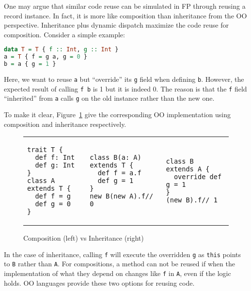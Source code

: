 One may argue that similar code reuse can be simulated in FP through reusing a record instance.
In fact, it is more like composition than inheritance from the OO perspective.
Inheritance plus dynamic dispatch maximize the code reuse for composition.
Consider a simple example:

\begin{lstlisting}[language=haskell]
data T = T { f :: Int, g :: Int }
a = T { f = g a, g = 0 }
b = a { g = 1 }
\end{lstlisting}
Here, we want to reuse \lstinline{a} but ``override'' its \lstinline{g} field when defining \lstinline{b}.
However, the expected result of calling \lstinline{f b} is 1 but it is indeed 0.
The reason is that the \lstinline{f} field ``inherited'' from \lstinline{a} calls
\lstinline{g} on the old instance rather than the new one.

To make it clear, Figure~\ref{code:compare} give the corresponding OO implementation using composition
and inheritance respectively.
\begin{figure}
\begin{tabular}{lll}
\begin{minipage}{.17\textwidth}
\begin{lstlisting}
trait T {
  def f: Int
  def g: Int
}
class A extends T {
  def f = g
  def g = 0
}
\end{lstlisting}
\end{minipage}
&
\begin{minipage}{.17\textwidth}
\begin{lstlisting}
class B(a: A) extends T {
  def f = a.f
  def g = 1
}
new B(new A).f// 0
\end{lstlisting}
\end{minipage}
&
\begin{minipage}{.17\textwidth}
\begin{lstlisting}
class B extends A {
  override def g = 1
}
(new B).f// 1
\end{lstlisting}
\end{minipage}
\end{tabular}
\caption{Composition (left) vs Inheritance (right)}
\label{code:compare}
\end{figure}
In the case of inheritance, calling \lstinline{f} will execute the overridden \lstinline{g}
as \lstinline{this} points to \lstinline{B} rather than \lstinline{A}.
For compositions, a method can not be reused if when the implementation of what
they depend on changes like \lstinline{f} in \lstinline{A}, even if the logic holds.
OO languages provide these two options for reusing code.

